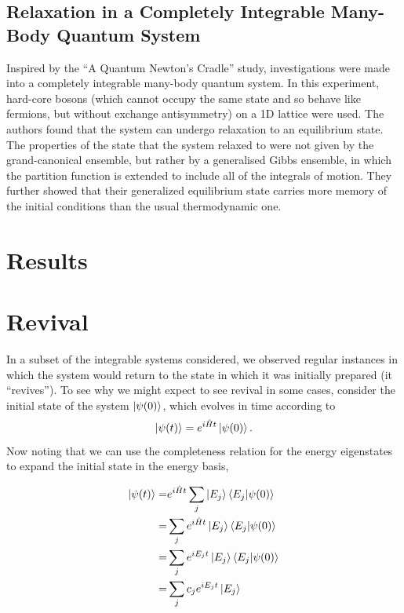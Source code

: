 \documentclass[a4paper,10pt]{article}
\begin{document}
\subsection{Relaxation in a Completely Integrable Many-Body Quantum System \cite{Rigol2007}}

Inspired by the ``A Quantum Newton's Cradle'' study, investigations were made into a completely integrable many-body quantum system. In this experiment, hard-core bosons (which cannot
occupy the same state and so behave like fermions, but without exchange antisymmetry) on a 1D lattice were used. The authors found that the system can undergo relaxation to an equilibrium 
state. The properties of the state that the system relaxed to were not given by the grand-canonical ensemble, but rather by a generalised Gibbs ensemble, in which the partition function 
is extended to include all of the integrals of motion. They further showed that their generalized equilibrium state carries more memory of the initial conditions than the usual thermodynamic one.





\section{Results}


\section{Revival}
In a subset of the integrable systems considered, we observed regular instances in which the system would return to the state in which it was initially prepared (it ``revives''). 
To see why we might expect to see revival in some cases, consider the initial state of the system $\ket{\psi(0)}$, which evolves in time according to
\begin{equation}
 \ket{\psi(t)}=e^{i\hat{H}t}\ket{\psi(0)}.
\end{equation}
Now noting that we can use the completeness relation for the energy eigenstates to expand the initial state in the energy basis,

\begin{align}
 \ket{\psi(t)} =&       e^{i\hat{H}t}\sum_j\ket{E_j}\braket{E_j|\psi(0)} \\
               =&\sum_je^{i\hat{H}t}\ket{E_j}\braket{E_j|\psi(0)} \\
                =&\sum_je^{iE_{j}t}\ket{E_j}\braket{E_j|\psi(0)} \\
                =&\sum_j c_{j}e^{iE_{j}t}\ket{E_j}
\end{align}
\end{document}
